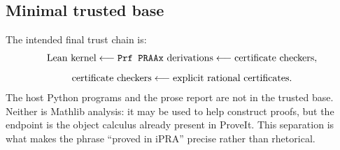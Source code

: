 \subsection{Minimal trusted base}

The intended final trust chain is:
\[
 \begin{gathered}
 \text{Lean kernel}
 \longleftarrow \texttt{Prf PRAAx}\text{ derivations}
 \longleftarrow \text{certificate checkers},\\[2mm]
 \text{certificate checkers}
 \longleftarrow \text{explicit rational certificates}.
 \end{gathered}
\]
The host Python programs and the prose report are not in the trusted base.
Neither is Mathlib analysis: it may be used to help construct proofs, but the
endpoint is the object calculus already present in ProveIt.  This separation is
what makes the phrase ``proved in iPRA'' precise rather than rhetorical.
